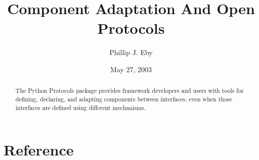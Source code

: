 \documentclass{manual}
\title{Component Adaptation And Open Protocols}
\author{Phillip J. Eby}
\date{May 27, 2003}       %
\begin{document}
\maketitle


%

\begin{abstract}

\noindent

The Python Protocols package provides framework developers and users with
tools for defining, declaring, and adapting components between interfaces,
even when those interfaces are defined using different mechanisms.

\end{abstract}

\tableofcontents

\chapter{Reference}













%
%
%
\renewcommand{\indexname}{Module Index}

\renewcommand{\indexname}{Index}
\end{document}
